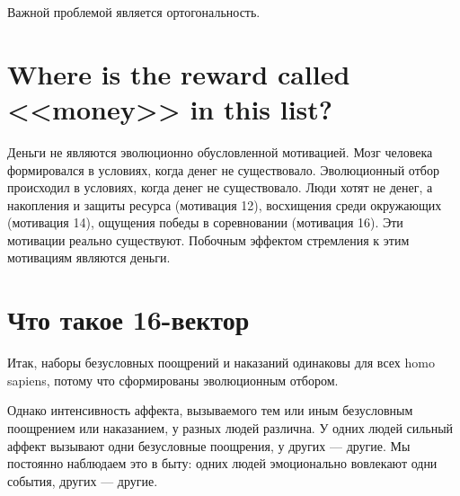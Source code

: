 \documentclass[11pt]{article}
\theoremstyle{remark}
\theoremstyle{definition}
\begin{document}
Важной проблемой является ортогональность.









\section{Where is the reward called <<money>> in this list?}






Деньги не являются эволюционно обусловленной мотивацией. Мозг человека формировался в условиях, когда денег не существовало. Эволюционный отбор происходил в условиях, когда денег не существовало. Люди хотят не денег, а накопления и защиты ресурса (мотивация 12), восхищения среди окружающих (мотивация 14), ощущения победы в соревновании (мотивация 16). Эти мотивации реально существуют. Побочным эффектом стремления к этим мотивациям являются деньги.





\section{Что такое 16-вектор}


Итак, наборы безусловных поощрений и наказаний одинаковы для всех homo sapiens, потому что сформированы эволюционным отбором.


Однако интенсивность аффекта, вызываемого тем или иным безусловным поощрением или наказанием, у разных людей различна. У одних людей сильный аффект вызывают одни безусловные поощрения, у других --- другие. Мы постоянно наблюдаем это в быту: одних людей эмоционально вовлекают одни события, других --- другие. %
\end{document}
